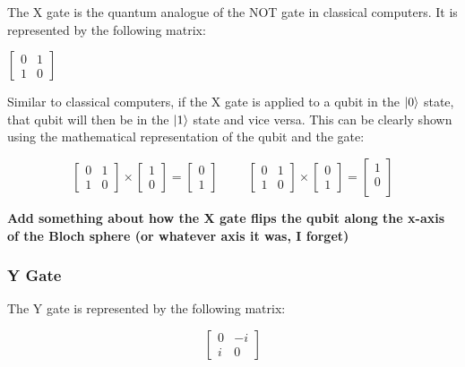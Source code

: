\documentclass{article}
\begin{document}
The X gate is the quantum analogue of the NOT gate in classical computers. It is represented by the following matrix:

\begin{center}
	$
	\begin{bmatrix}
		0 & 1 \\
		1 & 0
	\end{bmatrix}
	$
\end{center}

Similar to classical computers, if the X gate is applied to a qubit in the $\ket{0}$ state, that qubit will then be in the $\ket{1}$ state and vice versa. This can be clearly
shown using the mathematical representation of the qubit and the gate:

\begin{center}
	\[
		\begin{bmatrix}
			0 & 1 \\
			1 & 0
		\end{bmatrix}
		\times
		\begin{bmatrix}
			1 \\
			0
		\end{bmatrix}
		=
		\begin{bmatrix}
			0 \\
			1
		\end{bmatrix}
		\hspace{1cm}
		\begin{bmatrix}
			0 & 1 \\
			1 & 0
		\end{bmatrix}
		\times
		\begin{bmatrix}
			0 \\
			1
		\end{bmatrix}
		=
		\begin{bmatrix}
			1 \\
			0 \\
		\end{bmatrix}
	\]
\end{center}

\textbf{Add something about how the X gate flips the qubit along the x-axis of the Bloch sphere (or whatever axis it was, I forget)}

\subsubsection{Y Gate}
\label{sec:ygate}

The Y gate is represented by the following matrix:

\begin{center}
	\[
		\begin{bmatrix}
			0 & -i \\
			i & 0
		\end{bmatrix}
	\]
\end{center}
\end{document}
